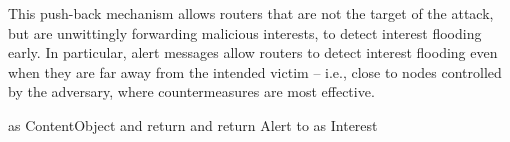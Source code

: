 \documentclass[10pt,conference,letterpaper]{IEEEtran}
\begin{document}
This push-back mechanism allows routers that are not the target of the attack, but are unwittingly forwarding malicious interests, to detect interest flooding early. In particular, alert messages allow routers to detect interest flooding even when they are far away from the intended victim -- i.e., close to nodes controlled by the adversary, where countermeasures are most effective.

\begin{algorithm}[ht!]
\caption{}\label{alg:push-back}
\begin{algorithmic}[1]
	\STATE   as ContentObject and return
\ENDIF
{}
			\STATE 
			\STATE 
	\ELSE
		\STATE   and return
	\ENDIF
\ENDIF
{}
	\IF{{ \AND }}  \STATE  
			\STATE  Alert to  \ENDIF
		\ELSE
		\STATE   as Interest
\ENDIF 
\ENDIF
\end{algorithmic}
\end{algorithm}




  
\begin{comment}
Threshold of PIT usages is set to  of PIT size; Threshold of rate are set to 3.0.

In this case, router drops packet coming from that interface until rate or PIT usage comes back the threshold.

In the push back when a router detects an attack it sends an alert packet to the interface that generates the attack detection. When a router receives an alert packet it reduces rate threshold by 0.5 and cuts by half PIT usage threshold. After a stationary time, where no other alert packets are received, a router increments rate threshold by  and PIT usage threshold by factor  both at every microsecond (maybe this value has to be changed). Incrementation phase lasts until thresholds reach base values.
\end{comment}



\begin{comment}
\subsection{Local countermeasure}
\label{local}

The second phase, called Reaction phase, has the purpose to reduce the impact of the attack over the network. A router, that detect an attack on a interface \textit{i}, acts as a filter so that interests coming from it have not the behavior of an attack. To obtain this behavior, when a router detect an attack, simply drops packets until  or  back below the bound.
\end{comment}
\end{document}
